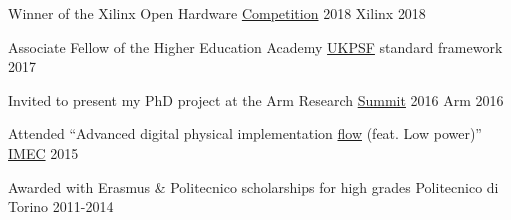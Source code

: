 
\vspace{-1mm}
\begin{cvhonors}

\cvhonor
{Winner of the Xilinx Open Hardware
{\color{myblue}\href{http://www.openhw.eu/2018-finalists.html}{Competition}}
2018}
{Xilinx}
{}
{2018}

\cvhonor
{Associate Fellow of the Higher Education Academy} %
{{\color{myblue}\href{https://www.heacademy.ac.uk/ukpsf}{UKPSF}} standard 
framework} %
{} %
{2017} %

\cvhonor
{Invited to present my PhD project at the Arm Research
{\color{myblue}\href{https://developer.arm.com/research/summit/previous-summits/2016/speakers}{Summit}}
 2016}
{Arm}
{}
{2016}

\cvhonor
{Attended ``Advanced digital physical implementation
{\color{myblue}\href{http://www.europractice.stfc.ac.uk/training/training_flyers/adpi20171024.pdf}{flow}}
 (feat. Low power)''}
{\color{myblue}\href{https://www.imec-int.com/en/about-us}{IMEC}}
{}
{2015}

\cvhonor
{Awarded with Erasmus \& Politecnico scholarships for high grades}
{Politecnico di Torino}
{}
{2011-2014}


\end{cvhonors}
\vspace{-1mm}